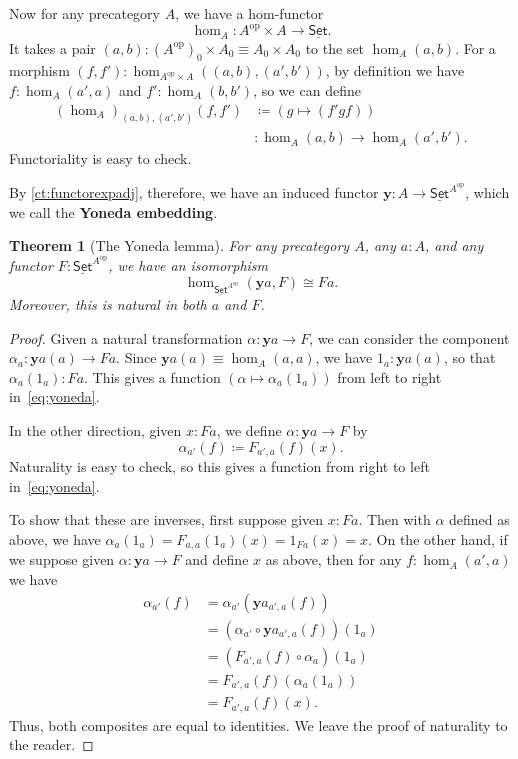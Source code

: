 \documentclass{amsart}
\newcommand{\jdeq}{\equiv}      %
\newcommand{\defeq}{\coloneqq}  %
\renewcommand{\set}{\ensuremath{\mathsf{Set}}\xspace}
\newcommand{\uset}{\ensuremath{\underline{\set}}\xspace}
\newtheorem{thm}{Theorem}[section]
\theoremstyle{definition}
\theoremstyle{remark}
\numberwithin{equation}{section}
\newcommand{\op}{^{\textrm{op}}}
\newcommand{\y}{\ensuremath{\mathbf{y}}\xspace}
\begin{document}
Now for any precategory $A$, we have a hom-functor
\[\hom_A : A\op \times A \to \uset.\]
It takes a pair $(a,b): (A\op)_0 \times A_0 \jdeq A_0 \times A_0$ to the set $\hom_A(a,b)$.
For a morphism $(f,f') : \hom_{A\op\times A}((a,b),(a',b'))$, by definition we have $f:\hom_A(a',a)$ and $f':\hom_A(b,b')$, so we can define 
\begin{align*}
  (\hom_A)_{(a,b),(a',b')}(f,f')
  &\defeq (g \mapsto (f'gf))\\
  &: \hom_A(a,b) \to \hom_A(a',b').
\end{align*}
Functoriality is easy to check.

By \autoref{ct:functorexpadj}, therefore, we have an induced functor $\y:A\to \uset^{A\op}$, which we call the \textbf{Yoneda embedding}.

\begin{thm}[The Yoneda lemma]\label{ct:yoneda}
  For any precategory $A$, any $a:A$, and any functor $F:\uset^{A\op}$, we have an isomorphism
  \begin{equation}\label{eq:yoneda}
    \hom_{\uset^{A\op}}(\y a, F) \cong Fa.
  \end{equation}
  Moreover, this is natural in both $a$ and $F$.
\end{thm}
\begin{proof}
  Given a natural transformation $\alpha:\y a \to F$, we can consider the component $\alpha_a : \y a(a) \to F a$.
  Since $\y a(a)\jdeq \hom_A(a,a)$, we have $1_a : \y a(a)$, so that $\alpha_a(1_a) : F a$.
  This gives a function $(\alpha \mapsto \alpha_a(1_a))$ from left to right in~\eqref{eq:yoneda}.

  In the other direction, given $x:F a$, we define $\alpha:\y a \to F$ by
  \[\alpha_{a'}(f) \defeq F_{a',a}(f)(x). \]
  Naturality is easy to check, so this gives a function from right to left in~\eqref{eq:yoneda}.

  To show that these are inverses, first suppose given $x:F a$.
  Then with $\alpha$ defined as above, we have $\alpha_a(1_a) = F_{a,a}(1_a)(x) = 1_{F a}(x) = x$.
  On the other hand, if we suppose given $\alpha:\y a \to F$ and define $x$ as above, then for any $f:\hom_A(a',a)$ we have
  \begin{align*}
    \alpha_{a'}(f)
    &= \alpha_{a'} (\y a_{a',a}(f))\\
    &= (\alpha_{a'}\circ \y a_{a',a}(f))(1_a)\\
    &= (F_{a',a}(f)\circ \alpha_a)(1_a)\\
    &= F_{a',a}(f)(\alpha_a(1_a))\\
    &= F_{a',a}(f)(x).
  \end{align*}
  Thus, both composites are equal to identities.
  We leave the proof of naturality to the reader.
\end{proof}
\end{document}
